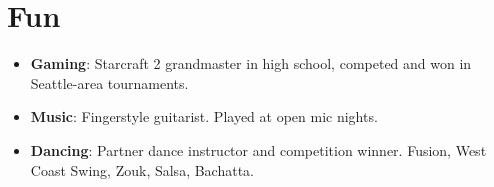 \documentclass[letterpaper,10.8pt]{article}
\newcommand{\resumeSubItem}[3]{
  \setlength{\itemsep}{1pt}
  \item\normalsize{
    \textbf{{#1}}{: \small{#2 \vspace{1pt}}} \\
    {\small{#3}\vspace{1pt}}
  }
}
\newcommand{\resumeSubHeadingListStart}{\begin{itemize}[label={}, leftmargin=0.05in]}
\newcommand{\resumeSubHeadingListEnd}{\end{itemize}}
\begin{document}
\section{Fun}
    \resumeSubHeadingListStart
        \resumeSubItem{Gaming}{Starcraft 2 grandmaster in high school, competed and won in Seattle-area tournaments.}{}
        \resumeSubItem{Music}{Fingerstyle guitarist. Played at open mic nights.}{}
        \resumeSubItem{Dancing}{Partner dance instructor and competition winner. Fusion, West Coast Swing, Zouk, Salsa, Bachatta.}{}
    \resumeSubHeadingListEnd
    



\end{document}
